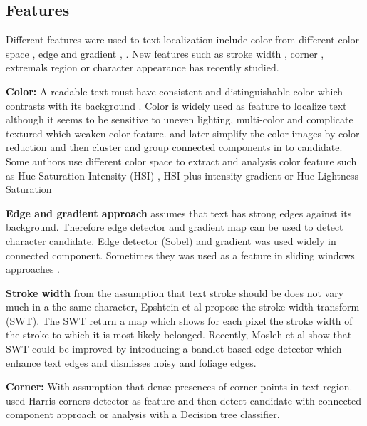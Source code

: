 \subsection{Features}


Different features were used to text localization include color from different color space \cite{yi.2012.TIP} \cite{Roubtsova.2012.SPIE}, edge and gradient \cite{Pillai.2013.ICCPCT}, \cite{Chen.2004.CVPR}. New features such as stroke width \cite{Subramanian.2007.ICDAR} \cite{Epshtein.2010.CVPR} , corner \cite{Zhao.2011.TIP}, extremals region \cite{Neumann.2011.ICDAR} \cite{xucheng.2013.pami} or character appearance \cite{Ye.2014.CBDAR} \cite{Yi.2013.CVIU} has recently studied.


\textbf{Color:} A readable text must have consistent and distinguishable color which contrasts with its background \cite{Liang.2005.IJDAR}. Color is widely used as feature to localize text \cite{Jain.1998.ICPR} \cite{Wang.2003.PR} \cite{Lee.2010.ICPR} although it seems to be sensitive to uneven lighting, multi-color and complicate textured which weaken color feature.
\cite{39} and later \cite{Nikolaou.2009.ISTI} simplify the color images by color reduction and then cluster and group connected components in to candidate. Some authors use different color space to extract and analysis color feature such as Hue-Saturation-Intensity (HSI) \cite{Garcia.2000.ICASSP}, HSI plus intensity gradient \cite{Neumann12} or Hue-Lightness-Saturation \cite{Karatzas.2004.ICPR}


\textbf{Edge and gradient approach} assumes that text has strong edges against its background. Therefore edge detector and gradient map can be used to detect character candidate. Edge detector \cite{Ye.2003.ICICS} (Sobel) \cite{Pillai.2013.ICCPCT} \cite{Shiva.2008.ICPR} and gradient was used widely in connected component. Sometimes they was used as a feature in sliding windows approaches \cite{Chen.2004.CVPR} \cite{Hanif.2008.ICPR}.


\textbf{Stroke width} from the assumption that text stroke should be does not vary much in a the same character, Epshtein et al \cite{Epshtein.2010.CVPR} propose the stroke width transform (SWT). The SWT return a map which shows for each pixel the stroke width of the stroke to which it is most likely belonged. Recently, Mosleh et al \cite{Mosleh.2012.BMVC} show that SWT could be improved by introducing a bandlet-based edge detector which enhance text edges and dismisses noisy and foliage edges.


\textbf{Corner: } With assumption that dense presences of corner points in text region. \cite{Zhao.2011.TIP} \cite{huang.2010.ICPR} used Harris corners detector as feature and then detect candidate with connected component approach \cite{huang.2010.ICPR} or analysis with a Decision tree classifier.


